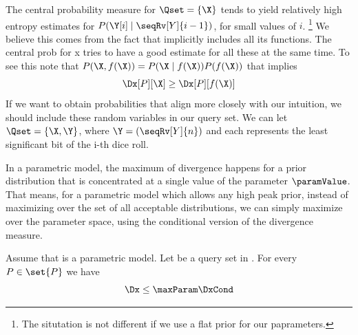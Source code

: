 The central probability measure for $\Qset = \{ \X \}$ tends to yield relatively high entropy estimates
for $P(\Y[i] \mid \seqRv[Y]{i-1})$, for small values of $i$.
\footnote{The situtation is not different
if we use a flat prior for our paprameters.}
We believe this comes from the fact that \X implicitly includes all its functions.
The central prob for x tries to have a good estimate for all these at the same time.
To see this note that $P(\X, f(\X)) = P(\X \mid f(\X))P(f(\X))$ that implies
\[
    \Dx[P][\X] \geq \Dx[P][f(\X)]
\]
If we want to obtain probabilities that align more closely with our intuition, we should include these random
variables in our query set.
We can let $\Qset = \{\X, \Y\}$, where $\Y = (\seqRv[Y]{n})$ and each \Y[i] represents the least significant bit of
the i-th dice roll.


In a parametric model, the maximum of divergence happens for a prior distribution
that is concentrated at a single value of the parameter $\paramValue$.
That means, for a parametric model which allows any high peak prior, instead of maximizing over the set of
all acceptable distributions, we can simply maximize over the parameter space, using the conditional version
of the divergence measure.

\begin{lemma}
    \label{lm:DxP_uppper_bound}
    Assume that \pmodel is a parametric model.
    Let \Xpairs be a query set in \Mt.
    For every $P \in \set{P}$ we have
    \begin{equation*}
        \Dx \leq \maxParam \DxCond
    \end{equation*}
\end{lemma}

